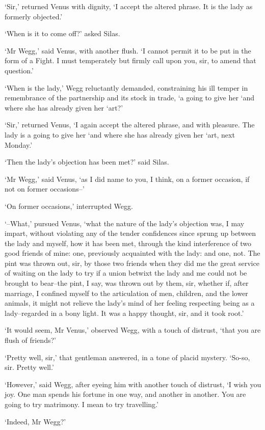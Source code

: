 ‘Sir,’ returned Venus with dignity, ‘I accept the altered phrase. It is
the lady as formerly objected.’

‘When is it to come off?’ asked Silas.

‘Mr Wegg,’ said Venus, with another flush. ‘I cannot permit it to be
put in the form of a Fight. I must temperately but firmly call upon you,
sir, to amend that question.’

‘When is the lady,’ Wegg reluctantly demanded, constraining his ill
temper in remembrance of the partnership and its stock in trade, ‘a
going to give her ‘and where she has already given her ‘art?’

‘Sir,’ returned Venus, ‘I again accept the altered phrase, and with
pleasure. The lady is a going to give her ‘and where she has already
given her ‘art, next Monday.’

‘Then the lady’s objection has been met?’ said Silas.

‘Mr Wegg,’ said Venus, ‘as I did name to you, I think, on a former
occasion, if not on former occasions--’

‘On former occasions,’ interrupted Wegg.

‘--What,’ pursued Venus, ‘what the nature of the lady’s objection was, I
may impart, without violating any of the tender confidences since sprung
up between the lady and myself, how it has been met, through the kind
interference of two good friends of mine: one, previously acquainted
with the lady: and one, not. The pint was thrown out, sir, by those two
friends when they did me the great service of waiting on the lady to
try if a union betwixt the lady and me could not be brought to bear--the
pint, I say, was thrown out by them, sir, whether if, after marriage,
I confined myself to the articulation of men, children, and the lower
animals, it might not relieve the lady’s mind of her feeling respecting
being as a lady--regarded in a bony light. It was a happy thought, sir,
and it took root.’

‘It would seem, Mr Venus,’ observed Wegg, with a touch of distrust,
‘that you are flush of friends?’

‘Pretty well, sir,’ that gentleman answered, in a tone of placid
mystery. ‘So-so, sir. Pretty well.’

‘However,’ said Wegg, after eyeing him with another touch of distrust,
‘I wish you joy. One man spends his fortune in one way, and another in
another. You are going to try matrimony. I mean to try travelling.’

‘Indeed, Mr Wegg?’

